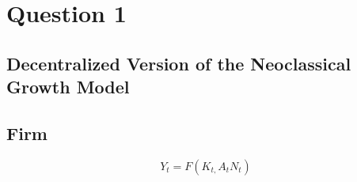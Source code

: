 \documentclass[12pt]{article}
\numberwithin{equation}{subsection} %
\begin{document}

\newpage
\section{Question 1}
\subsection{Decentralized Version of the Neoclassical Growth Model}
\subsection{Firm}
\begin{equation} \label{eqGEW}
Y_t=F(K_{t,}A_{t }N_{t})
\end{equation}
\end{document}
